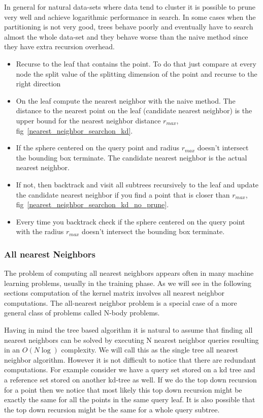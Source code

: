 \documentclass[12pt,letterpaper,doublespaced,ETD,dvips,proposal]{gtthesis}
\begin{document}
\begin{Body}
 In general for natural data-sets where data tend to cluster it is
 possible to prune very well  and achieve logarithmic performance in
 search. In some cases when the partitioning is not very good, trees
 behave poorly and eventually have to search almost the whole
 data-set and they behave worse than the naive method since they
 have extra recursion overhead.

\begin{itemize}
   \item Recurse to the leaf that contains the point. To do that
   just compare at every node the split value of the splitting
   dimension of the point and recurse to the right direction
   \item On the leaf compute the nearest neighbor with the naive
   method. The distance to the nearest point on the leaf (candidate nearest neighbor)
   is the upper bound for the nearest neighbor distance $r_{max}$,
   fig~\ref{nearest_neighbor_searchon_kd}.
   \item If the sphere centered on the query point and radius
   $r_{max}$ doesn't intersect the bounding box terminate. The
   candidate nearest neighbor is the actual nearest neighbor.
   \item If not, then backtrack and visit all subtrees recursively
   to the leaf and update the candidate nearest neighbor if you find
   a point that is closer than $r_{max}$, fig~\ref{nearest_neighbor_searchon_kd_no_prune}.
   \item Every time you backtrack check if the sphere centered on
   the query point with the radius $r_{max}$ doesn't intersect the
   bounding box terminate.
 \end{itemize}


\subsubsection{All nearest Neighbors}
The problem of computing all nearest neighbors appears often in many
machine learning problems, usually in the training phase. As we will
see in the following sections computation of the kernel matrix
involves all nearest neighbor computations. The all-nearest neighbor
problem is a special case of a more general class of problems called
N-body problems.

Having in mind the tree based algorithm it is natural to assume that
finding all nearest neighbors can be solved by executing N nearest
neighbor queries resulting in an $O(N\log )$ complexity. We will
call this as the single tree all nearest neighbor algorithm. However
it is not difficult to notice that there are redundant computations.
For example consider we have a query set stored on a kd tree and a
reference set stored on another kd-tree as well. If we do the top
down recursion for a point then we notice that most likely this top
down recursion might be exactly the same for all the points in the
same query leaf. It is also possible that the top down recursion
might be the same for a whole query subtree.


\end{Body}
\end{document}
